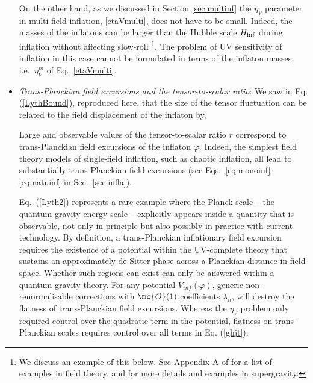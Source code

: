 \begin{itemize}
On the other hand, as we discussed in Section \ref{sec:multinf}  the $\eta_V$ parameter in multi-field inflation, \eqref{etaVmulti}, does not have to be small. Indeed, the masses of the inflatons can be larger than the Hubble scale $H_{\rm inf}$ during inflation without affecting slow-roll \cite{Chakraborty:2019dfh,Aragam:2021scu}\footnote{We discuss an example of this below. See Appendix A of \cite{Chakraborty:2019dfh} for  a list of examples in field theory, and \cite{Aragam:2021scu} for  more details and examples in supergravity.}. The problem of UV sensitivity of inflation in this case cannot be formulated in terms of the inflaton masses, i.e.~$\eta_V^m$ of Eq.~\eqref{etaVmulti}. 

\item \emph{Trans-Planckian field excursions and the tensor-to-scalar ratio}: We saw in Eq. (\ref{LythBound}), reproduced here, that the size of the tensor fluctuation can be related to the field displacement of the inflaton by,

\be
\setlength\fboxsep{0.25cm}
\setlength\fboxrule{0.4pt}
 \ee
Large and observable values of the tensor-to-scalar ratio $r$ correspond to trans-Planckian field excursions of the inflaton $\varphi$. Indeed, the simplest field theory models of single-field  inflation, such as chaotic inflation, all lead to substantially trans-Planckian field excursions (see Eqs.~\eqref{eq:monoinf}-\eqref{eq:natuinf} in Sec.~\ref{sec:infla}).

Eq.~(\ref{Lyth2}) represents a rare example where the Planck scale -- the quantum gravity energy scale -- explicitly appears inside a quantity that is observable, not only in principle but also possibly in practice with current technology. By definition, a trans-Planckian inflationary field excursion requires the existence of a potential within the UV-complete theory that sustains an approximately de Sitter phase across a Planckian distance in field space. Whether such regions can exist can only be answered within a quantum gravity theory.  For any potential $V_{inf} (\varphi)$, generic non-renormalisable corrections with $\mc{O}(1)$ coefficients $\lambda_n$,
\be
\setlength\fboxsep{0.25cm}
\setlength\fboxrule{0.4pt}
\ee
will destroy the flatness of trans-Planckian field excursions. Whereas the $\eta_V$ problem only required control over the quadratic term in the potential, flatness on trans-Planckian scales requires control over all terms in Eq. (\ref{ghjt}).  


\end{itemize}
